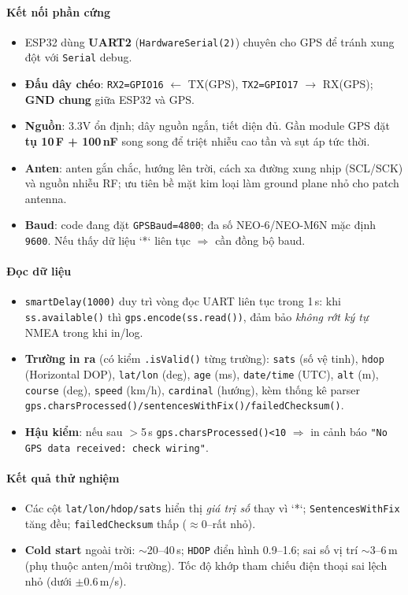 \paragraph{Kết nối phần cứng}
\begin{itemize}
  \item ESP32 dùng \textbf{UART2} (\texttt{HardwareSerial(2)}) chuyên cho GPS để tránh xung đột với \texttt{Serial} debug.
  \item \textbf{Đấu dây chéo}: \texttt{RX2=GPIO16} $\leftarrow$ TX(GPS), \texttt{TX2=GPIO17} $\rightarrow$ RX(GPS); \textbf{GND chung} giữa ESP32 và GPS.
  \item \textbf{Nguồn}: 3.3V ổn định; dây nguồn ngắn, tiết diện đủ. Gần module GPS đặt \textbf{tụ 10\,\textmu F + 100\,nF} song song để triệt nhiễu cao tần và sụt áp tức thời.
  \item \textbf{Anten}: anten gắn chắc, hướng lên trời, cách xa đường xung nhịp (SCL/SCK) và nguồn nhiễu RF; ưu tiên bề mặt kim loại làm ground plane nhỏ cho patch antenna.
  \item \textbf{Baud}: code đang đặt \texttt{GPSBaud=4800}; đa số NEO-6/NEO-M6N mặc định \texttt{9600}. Nếu thấy dữ liệu `*` liên tục $\Rightarrow$ cần đồng bộ baud.
\end{itemize}

\paragraph{Đọc dữ liệu}
\begin{itemize}
  \item \texttt{smartDelay(1000)} duy trì vòng đọc UART liên tục trong 1\,s: khi \texttt{ss.available()} thì \texttt{gps.encode(ss.read())}, đảm bảo \emph{không rớt ký tự} NMEA trong khi in/log.
  \item \textbf{Trường in ra} (có kiểm \texttt{.isValid()} từng trường): 
  \texttt{sats} (số vệ tinh), \texttt{hdop} (Horizontal DOP), \texttt{lat/lon} (deg), \texttt{age} (ms), \texttt{date/time} (UTC), \texttt{alt} (m), \texttt{course} (deg), \texttt{speed} (km/h), \texttt{cardinal} (hướng), 
  kèm thống kê parser \texttt{gps.charsProcessed()/sentencesWithFix()/failedChecksum()}.
  \item \textbf{Hậu kiểm}: nếu sau $>$5\,s \texttt{gps.charsProcessed()<10} $\Rightarrow$ in cảnh báo \texttt{"No GPS data received: check wiring"}.
  \end{itemize}
\paragraph{Kết quả thử nghiệm}
\begin{itemize}
  \item Các cột \texttt{lat/lon/hdop/sats} hiển thị \emph{giá trị số} thay vì `*`; \texttt{SentencesWithFix} tăng đều; \texttt{failedChecksum} thấp (\(\approx 0\)–rất nhỏ).
  \item \textbf{Cold start} ngoài trời: \(\sim\)20--40\,s; \texttt{HDOP} điển hình 0.9--1.6; sai số vị trí \(\sim\)3--6\,m (phụ thuộc anten/môi trường). Tốc độ khớp tham chiếu điện thoại sai lệch nhỏ (dưới \(\pm 0.6\)\,m/s).
\end{itemize}


